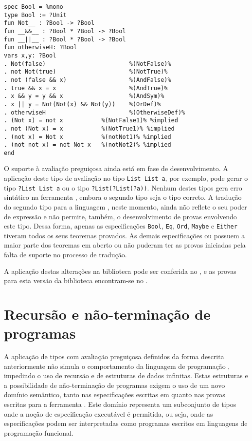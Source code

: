 \begin{Verbatim}
spec Bool = %mono
type Bool := ?Unit 
fun Not__ : ?Bool -> ?Bool
fun __&&__ : ?Bool * ?Bool -> ?Bool
fun __||__ : ?Bool * ?Bool -> ?Bool
fun otherwiseH: ?Bool      
vars x,y: ?Bool
. Not(false)                        %(NotFalse)%
. not Not(true)                     %(NotTrue)%
. not (false && x)                  %(AndFalse)%
. true && x = x                     %(AndTrue)%
. x && y = y && x                   %(AndSym)%
. x || y = Not(Not(x) && Not(y))    %(OrDef)%
. otherwiseH                        %(OtherwiseDef)%
. (Not x) = not x           %(NotFalse1)% %implied
. not (Not x) = x           %(NotTrue1)% %implied
. (not x) = Not x           %(notNot1)% %implied
. (not not x) = not Not x   %(notNot2)% %implied
end
\end{Verbatim}

O suporte à avaliação preguiçosa ainda está em fase de desenvolvimento.
A aplicação deste tipo de avaliação no tipo \Verb.List List a., por exemplo, pode gerar o tipo \Verb.?List List a. ou o tipo \Verb.?List(?List(?a))..
Nenhum destes tipos gera erro sintático na ferramenta \Hets, embora o segundo tipo seja o tipo correto.
A tradução do segundo tipo para a linguagem \HOL, neste momento, ainda não reflete o seu poder de expressão e não permite, também, o desenvolvimento de provas envolvendo este tipo.
Dessa forma, apenas as especificações \Verb.Bool., \Verb.Eq., \Verb.Ord., \Verb.Maybe. e \Verb.Either. tiveram todos os seus teoremas provados.
As demais especificações ou possuem a maior parte dos teoremas em aberto ou não puderam ter as provas iniciadas pela falta de suporte no processo de tradução.

A aplicação destas alterações na biblioteca pode ser conferida no , e as provas para esta versão da biblioteca encontram-se no .

\section{Recursão e não-terminação de programas}
A aplicação de tipos com avaliação preguiçosa definidos da forma descrita anteriormente não simula o comportamento da linguagem de programação \Haskell, impedindo o uso de recursão e de estruturas de dados infinitas.
Estas estruturas e a possibilidade de não-terminação de programas exigem o uso de um novo domínio semântico, tanto nas especificações escritas em \HasCASL quanto nas provas escritas para a ferramenta \Isabelle.
Este domínio representa um subconjunto de tipos onde a noção de especificação executável é permitida, ou seja, onde as especificações podem ser interpretadas como programas escritos em linguagens de programação funcional.

